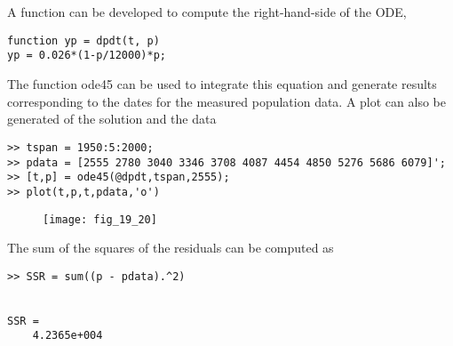 \documentclass[../main.tex]{subfiles}
\begin{document}
\section{}
A function can be developed to compute the right-hand-side of the ODE,
	\bigbreak
\begin{lstlisting}[numbers=none]
function yp = dpdt(t, p)
yp = 0.026*(1-p/12000)*p;
\end{lstlisting}
	\bigbreak
\begin{blockquote}
The function ode45 can be used to integrate this equation and generate results corresponding to the dates for the measured population data. A plot can also be generated of the solution and the data
\end{blockquote}
	\bigbreak
\begin{lstlisting}[numbers=none]
>> tspan = 1950:5:2000;
>> pdata = [2555 2780 3040 3346 3708 4087 4454 4850 5276 5686 6079]';
>> [t,p] = ode45(@dpdt,tspan,2555);
>> plot(t,p,t,pdata,'o') 
\end{lstlisting}
	\bigbreak
	\begin{figure}[H]
		\texttt{[image: fig\_19\_20]}
		\label{fig:fig_19_20}
	\end{figure}
	\bigbreak
The sum of the squares of the residuals can be computed as
	\bigbreak
\begin{lstlisting}[numbers=none]
>> SSR = sum((p - pdata).^2)


SSR =
	4.2365e+004
\end{lstlisting}
	\bigbreak
	\bigbreak
	\bigbreak
	\bigbreak
	\bigbreak
	\bigbreak
	\bigbreak
	\bigbreak
	\bigbreak
	\bigbreak
	\bigbreak
	\bigbreak
	\bigbreak
	\bigbreak
	\bigbreak
	\bigbreak
	\bigbreak
	\bigbreak
	\bigbreak
	\bigbreak
\end{document}
